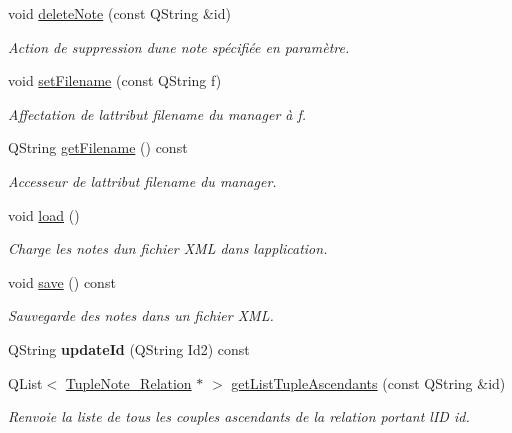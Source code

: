 \begin{DoxyCompactItemize}
void \hyperlink{class_notes_manager_a989429244c36c35ef68204f6ae2a0a5f}{delete\+Note} (const Q\+String \&id)
\begin{DoxyCompactList}\small\item\em Action de suppression d\textquotesingle{}une note spécifiée en paramètre. \end{DoxyCompactList}\item 
void \hyperlink{class_notes_manager_a797d858176de3f5e64aa8194797909fb}{set\+Filename} (const Q\+String f)
\begin{DoxyCompactList}\small\item\em Affectation de l\textquotesingle{}attribut filename du manager à f. \end{DoxyCompactList}\item 
Q\+String \hyperlink{class_notes_manager_a566cbb0dd7b606ec34629a2aa8010b73}{get\+Filename} () const
\begin{DoxyCompactList}\small\item\em Accesseur de l\textquotesingle{}attribut filename du manager. \end{DoxyCompactList}\item 
void \hyperlink{class_notes_manager_ad4fb2de50633dd25b71024343341cd64}{load} ()
\begin{DoxyCompactList}\small\item\em Charge les notes d\textquotesingle{}un fichier X\+ML dans l\textquotesingle{}application. \end{DoxyCompactList}\item 
void \hyperlink{class_notes_manager_ad271bd7f8079b01b04a32b886b498bac}{save} () const
\begin{DoxyCompactList}\small\item\em Sauvegarde des notes dans un fichier X\+ML. \end{DoxyCompactList}\item 
\mbox{\label{class_notes_manager_a2a8aba4f2f40239fce1b541a10b92a7e}} 
Q\+String {\bfseries update\+Id} (Q\+String Id2) const
\item 
Q\+List$<$ \hyperlink{class_tuple_note___relation}{Tuple\+Note\+\_\+\+Relation} $\ast$ $>$ \hyperlink{class_notes_manager_a9f2c72d67d67c89a61f77a9b1a0ae390}{get\+List\+Tuple\+Ascendants} (const Q\+String \&id)
\begin{DoxyCompactList}\small\item\em Renvoie la liste de tous les couples ascendants de la relation portant l\textquotesingle{}ID id. \end{DoxyCompactList}\item 

\end{DoxyCompactItemize}
